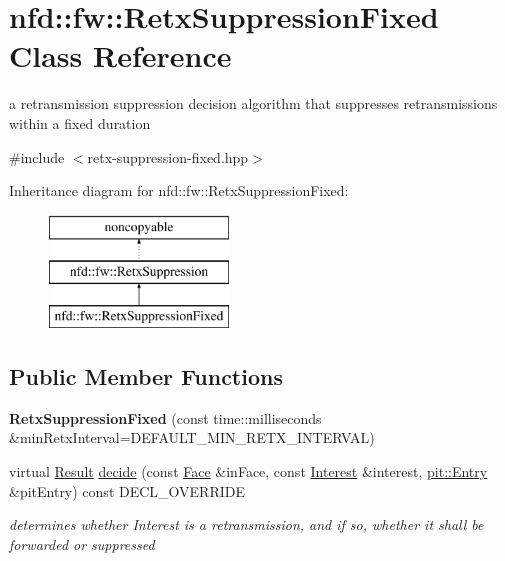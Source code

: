 \hypertarget{classnfd_1_1fw_1_1RetxSuppressionFixed}{}\section{nfd\+:\+:fw\+:\+:Retx\+Suppression\+Fixed Class Reference}
\label{classnfd_1_1fw_1_1RetxSuppressionFixed}


a retransmission suppression decision algorithm that suppresses retransmissions within a fixed duration  




{\ttfamily \#include $<$retx-\/suppression-\/fixed.\+hpp$>$}

Inheritance diagram for nfd\+:\+:fw\+:\+:Retx\+Suppression\+Fixed\+:\begin{figure}[H]
\begin{center}
\leavevmode
\includegraphics[height=3.000000cm]{classnfd_1_1fw_1_1RetxSuppressionFixed}
\end{center}
\end{figure}
\subsection*{Public Member Functions}
\begin{DoxyCompactItemize}
\item 
{\bfseries Retx\+Suppression\+Fixed} (const time\+::milliseconds \&min\+Retx\+Interval=D\+E\+F\+A\+U\+L\+T\+\_\+\+M\+I\+N\+\_\+\+R\+E\+T\+X\+\_\+\+I\+N\+T\+E\+R\+V\+AL)\hypertarget{classnfd_1_1fw_1_1RetxSuppressionFixed_aa84f6650feb3259a0b66aafce723f15b}{}\label{classnfd_1_1fw_1_1RetxSuppressionFixed_aa84f6650feb3259a0b66aafce723f15b}

\item 
virtual \hyperlink{classnfd_1_1fw_1_1RetxSuppression_af3180f6ce660253c6b415057b817af82}{Result} \hyperlink{classnfd_1_1fw_1_1RetxSuppressionFixed_ab8e03d6a534f30807dea7460d51113f9}{decide} (const \hyperlink{classnfd_1_1Face}{Face} \&in\+Face, const \hyperlink{classndn_1_1Interest}{Interest} \&interest, \hyperlink{classnfd_1_1pit_1_1Entry}{pit\+::\+Entry} \&pit\+Entry) const D\+E\+C\+L\+\_\+\+O\+V\+E\+R\+R\+I\+DE\hypertarget{classnfd_1_1fw_1_1RetxSuppressionFixed_ab8e03d6a534f30807dea7460d51113f9}{}\label{classnfd_1_1fw_1_1RetxSuppressionFixed_ab8e03d6a534f30807dea7460d51113f9}

\begin{DoxyCompactList}\small\item\em determines whether Interest is a retransmission, and if so, whether it shall be forwarded or suppressed \end{DoxyCompactList}\end{DoxyCompactItemize}
